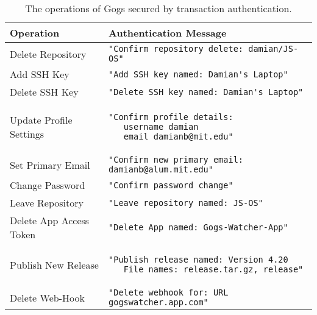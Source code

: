 \begin{table}[h]
\centering

\begin{tabular}{ m{5cm} m{9cm}  } 
 \hline
 Operation & Authentication Message \\ 
 \hline \hline

 Delete Repository & \lstinline|"Confirm repository delete: damian/JS-OS"| \\ \hline

 Add SSH Key & \lstinline|"Add SSH key named: Damian's Laptop"| \\ \hline

 Delete SSH Key & \lstinline|"Delete SSH key named: Damian's Laptop"| \\ \hline

 Update Profile Settings & 
 \begin{lstlisting} 
"Confirm profile details:
   username damian
   email damianb@mit.edu"
\end{lstlisting} 
\\ \hline

 Set Primary Email & \lstinline|"Confirm new primary email: damianb@alum.mit.edu"| \\ \hline

 Change Password & \lstinline|"Confirm password change"| \\ \hline

 Leave Repository & \lstinline|"Leave repository named: JS-OS"| \\ \hline

 Delete App Access Token & \lstinline|"Delete App named: Gogs-Watcher-App"| \\ \hline

 Publish New Release &
 \begin{lstlisting} 
"Publish release named: Version 4.20
   File names: release.tar.gz, release"
\end{lstlisting} 
\\ \hline

  Delete Web-Hook & \lstinline|"Delete webhook for: URL gogswatcher.app.com"| \\ \hline

\end{tabular}
\caption{The operations of Gogs secured by transaction authentication.}
\label{Table:GogsSecuredRoutes}
\end{table}

